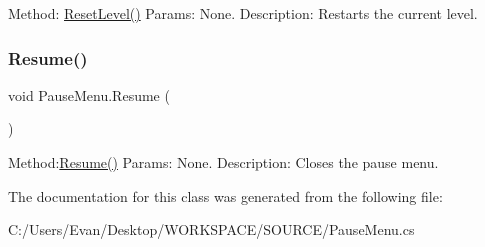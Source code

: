 Method\+: \mbox{\hyperlink{class_pause_menu_a701999bbc15ddc71f197239875b55fda}{Reset\+Level()}} Params\+: None. Description\+: Restarts the current level. \mbox{\label{class_pause_menu_a4416b25e65dfadf57cd8657eaf94f7df}} 
\subsubsection{\texorpdfstring{Resume()}{Resume()}}
{\footnotesize\ttfamily void Pause\+Menu.\+Resume (\begin{DoxyParamCaption}{ }\end{DoxyParamCaption})}

Method\+:\mbox{\hyperlink{class_pause_menu_a4416b25e65dfadf57cd8657eaf94f7df}{Resume()}} Params\+: None. Description\+: Closes the pause menu. 

The documentation for this class was generated from the following file\+:\begin{DoxyCompactItemize}
\item 
C\+:/\+Users/\+Evan/\+Desktop/\+W\+O\+R\+K\+S\+P\+A\+C\+E/\+S\+O\+U\+R\+C\+E/Pause\+Menu.\+cs\end{DoxyCompactItemize}
